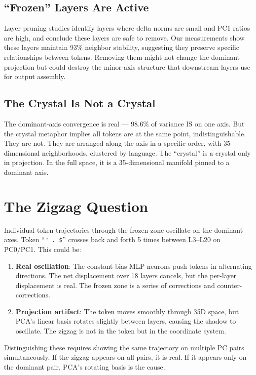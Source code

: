 \documentclass[11pt]{article}
\begin{document}
\subsection{``Frozen'' Layers Are Active}

Layer pruning studies identify layers where delta norms are small and PC1 ratios are high, and conclude these layers are safe to remove. Our measurements show these layers maintain 93\% neighbor stability, suggesting they preserve specific relationships between tokens. Removing them might not change the dominant projection but could destroy the minor-axis structure that downstream layers use for output assembly.

\subsection{The Crystal Is Not a Crystal}

The dominant-axis convergence is real --- 98.6\% of variance IS on one axis. But the crystal metaphor implies all tokens are at the same point, indistinguishable. They are not. They are arranged along the axis in a specific order, with 35-dimensional neighborhoods, clustered by language. The ``crystal'' is a crystal only in projection. In the full space, it is a 35-dimensional manifold pinned to a dominant axis.

\section{The Zigzag Question}

Individual token trajectories through the frozen zone oscillate on the dominant axes. Token ``\texttt{" . \$}'' crosses back and forth 5 times between L3--L20 on PC0/PC1. This could be:

\begin{enumerate}
\item \textbf{Real oscillation}: The constant-bias MLP neurons push tokens in alternating directions. The net displacement over 18 layers cancels, but the per-layer displacement is real. The frozen zone is a series of corrections and counter-corrections.
\item \textbf{Projection artifact}: The token moves smoothly through 35D space, but PCA's linear basis rotates slightly between layers, causing the shadow to oscillate. The zigzag is not in the token but in the coordinate system.
\end{enumerate}

Distinguishing these requires showing the same trajectory on multiple PC pairs simultaneously. If the zigzag appears on all pairs, it is real. If it appears only on the dominant pair, PCA's rotating basis is the cause.
\end{document}
